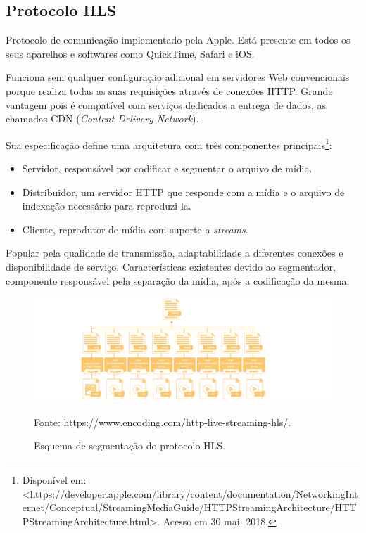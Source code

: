 \subsection{Protocolo HLS}

Protocolo de comunicação implementado pela Apple. Está presente em todos os seus aparelhos e softwares como QuickTime, Safari e iOS.

Funciona sem qualquer configuração adicional em servidores Web convencionais porque realiza todas as suas requisições através de conexões HTTP. Grande vantagem pois é compatível com serviços dedicados a entrega de dados, as chamadas CDN (\textit{Content Delivery Network}).

Sua especificação define uma arquitetura com três componentes principais\footnote{Disponível em: 
<https://developer.apple.com/library/content/documentation/NetworkingInternet/Conceptual/StreamingMediaGuide/HTTPStreamingArchitecture/HTTPStreamingArchitecture.html>. Acesso em 30 mai. 2018.}:


\begin{itemize}
	\item Servidor, responsável por codificar e segmentar o arquivo de mídia.
    \item Distribuidor, um servidor HTTP que responde com a mídia e o arquivo de indexação necessário para reproduzi-la. 
    \item Cliente, reprodutor de mídia com suporte a \textit{streams}.
\end{itemize}

Popular pela qualidade de transmissão, adaptabilidade a diferentes conexões e disponibilidade de serviço. Características existentes devido ao segmentador, componente responsável pela separação da mídia, após a codificação da mesma.

\begin{figure}[ht!]
	\centering
    \includegraphics[scale=0.45]{figures/hls-segments.png} 
    \caption{Esquema de segmentação do protocolo HLS.}
    \small Fonte: https://www.encoding.com/http-live-streaming-hls/.
	\label{fig:hls_segments}
\end{figure}

